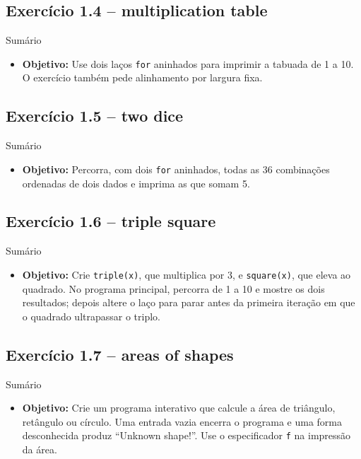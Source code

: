 \documentclass[11pt,a4paper]{article}
\begin{document}
\subsection*{Exercício 1.4 -- multiplication table}
\begin{exercicio}{Sumário}
\begin{itemize}
    \item \textbf{Objetivo:} Use dois laços \texttt{for} aninhados para imprimir a tabuada de 1 a 10. O exercício também pede alinhamento por largura fixa.
\end{itemize}
\end{exercicio}

\subsection*{Exercício 1.5 -- two dice}
\begin{exercicio}{Sumário}
\begin{itemize}
    \item \textbf{Objetivo:} Percorra, com dois \texttt{for} aninhados, todas as 36 combinações ordenadas de dois dados e imprima as que somam 5.
\end{itemize}
\end{exercicio}

\subsection*{Exercício 1.6 -- triple square}
\begin{exercicio}{Sumário}
\begin{itemize}
    \item \textbf{Objetivo:} Crie \texttt{triple(x)}, que multiplica por 3, e \texttt{square(x)}, que eleva ao quadrado. No programa principal, percorra de 1 a 10 e mostre os dois resultados; depois altere o laço para parar antes da primeira iteração em que o quadrado ultrapassar o triplo.
\end{itemize}
\end{exercicio}

\subsection*{Exercício 1.7 -- areas of shapes}
\begin{exercicio}{Sumário}
\begin{itemize}
    \item \textbf{Objetivo:} Crie um programa interativo que calcule a área de triângulo, retângulo ou círculo. Uma entrada vazia encerra o programa e uma forma desconhecida produz ``Unknown shape!''. Use o especificador \texttt{f} na impressão da área.
\end{itemize}
\end{exercicio}
\end{document}
